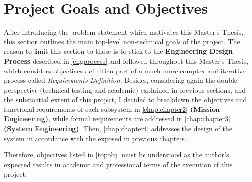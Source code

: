 \section{Project Goals and Objectives}\label{sec:obj}


After introducing the problem statement which motivates this Master's Thesis, this section outlines the main top-level non-technical goals of the project. The reason to limit this section to those is to stick to the \textbf{Engineering Design Process} described in \autoref{engprocess} and followed throughout this Master's Thesis, which considers objectives definition part of a much more complex and iterative process called \textit{Requirements Definition}. Besides, considering again the double perspective (technical testing and academic) explained in previous sections, and the substantial extent of this project, I decided to breakdown the objectives and functional requirements of each subsystem in \autoref{chap:chapter2} \textbf{(Mission Engineering)}, while formal requirements are addressed in \autoref{chap:chapter3} \textbf{(System Engineering)}. Then, \autoref{chap:chapter4} addresses the design of the system in accordance with the exposed in previous chapters.

Therefore, objectives listed in \autoref{topobj} must be understood as the author's expected results in academic and professional terms of the execution of this project.

